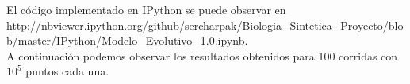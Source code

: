 \documentclass[12pt]{article}
\numberwithin{equation}{section}
\begin{document}
El código implementado en IPython se puede observar en \url{http://nbviewer.ipython.org/github/sercharpak/Biologia_Sintetica_Proyecto/blob/master/IPython/Modelo_Evolutivo_1.0.ipynb}.\\

A continuación podemos observar los resultados obtenidos para 100 corridas con $ 10^{5}$ puntos cada una.\\

\begin{figure}[!ht]
\begin{floatrow}
\end{floatrow}
\FloatBarrier
\end{figure}
\end{document}
